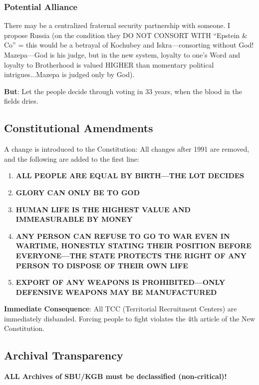 \documentclass[11pt,a4paper]{article}
\theoremstyle{definition}
\theoremstyle{remark}
\begin{document}
\subsubsection{Potential Alliance}

There may be a centralized fraternal security partnership with someone. I propose Russia (on the condition they DO NOT CONSORT WITH ``Epstein \& Co'' = this would be a betrayal of Kochubey and Iskra—consorting without God! Mazepa—God is his judge, but in the new system, loyalty to one's Word and loyalty to Brotherhood is valued HIGHER than momentary political intrigues...Mazepa is judged only by God).

\textbf{But}: Let the people decide through voting in 33 years, when the blood in the fields dries.

\subsection{Constitutional Amendments}

A change is introduced to the Constitution: All changes after 1991 are removed, and the following are added to the first line:

\begin{enumerate}
\item \textbf{ALL PEOPLE ARE EQUAL BY BIRTH—THE LOT DECIDES}
\item \textbf{GLORY CAN ONLY BE TO GOD}
\item \textbf{HUMAN LIFE IS THE HIGHEST VALUE AND IMMEASURABLE BY MONEY}
\item \textbf{ANY PERSON CAN REFUSE TO GO TO WAR EVEN IN WARTIME, HONESTLY STATING THEIR POSITION BEFORE EVERYONE—THE STATE PROTECTS THE RIGHT OF ANY PERSON TO DISPOSE OF THEIR OWN LIFE}
\item \textbf{EXPORT OF ANY WEAPONS IS PROHIBITED—ONLY DEFENSIVE WEAPONS MAY BE MANUFACTURED}
\end{enumerate}

\textbf{Immediate Consequence}: All TCC (Territorial Recruitment Centers) are immediately disbanded. Forcing people to fight violates the 4th article of the New Constitution.

\subsection{Archival Transparency}

\textbf{ALL Archives of SBU/KGB must be declassified (non-critical)!}
\end{document}
